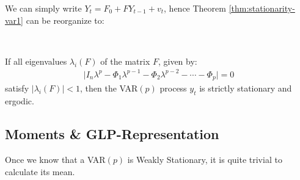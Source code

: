 We can simply write $Y_t = F_0 + F Y_{t-1} + v_t$,
hence Theorem \ref{thm:stationarity-var1} can be reorganize to:
\begin{theorem}\label{thm:stationarity-varp-2}
    \

    If all eigenvalues $\lambda_i(F)$ of the matrix $F$, given by:
    \begin{gather*}
        \vert I_n \lambda^p - \Phi_1 \lambda^{p-1} - \Phi_2 \lambda^{p-2} - \cdots - \Phi_p \vert = 0
    \end{gather*}
    satisfy $\vert \lambda_i(F) \vert < 1$,
    then the VAR$(p)$ process $y_t$ is strictly stationary and ergodic.
\end{theorem}

\subsection{Moments \& GLP-Representation}
Once we know that a VAR$(p)$ is Weakly Stationary, it is quite trivial to calculate its mean.

